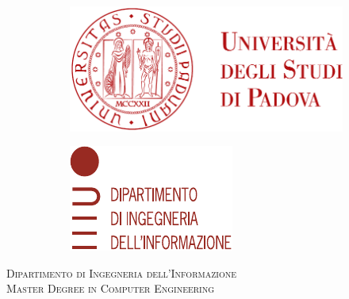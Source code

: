 \begin{titlepage}
	\begin{figure}
		\centering
		\begin{subfigure}[b]{0.4\textwidth}
			\includegraphics[width=\textwidth]{images/logo_unipd}
		\end{subfigure}
		\hfill
		\begin{subfigure}[b]{0.3\textwidth}
			\includegraphics[width=\textwidth]{images/logo_dei}
		\end{subfigure}
	\end{figure}


	\begin{center}
		\makeatletter %

		\textsc{Dipartimento di Ingegneria dell'Informazione}\\
		\textsc{Master Degree in Computer Engineering}


\end{center}
\end{titlepage}
